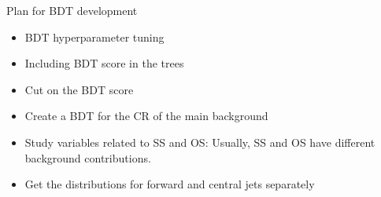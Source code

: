 \begin{frame}{Plan for BDT development}
    \begin{itemize}
        \item {\large BDT hyperparameter tuning}
        \vspace{0.2cm}
        \item {\large Including BDT score in the trees}
        \vspace{0.2cm}
        \item {\large Cut on the BDT score}
        \vspace{0.2cm}
        \item {\large Create a BDT for the CR of the main background}
        \vspace{0.2cm}
        \item Study variables related to SS and OS: Usually, SS and OS have different background contributions.
        \item Get the distributions for forward and central jets separately
    \end{itemize}
\end{frame}